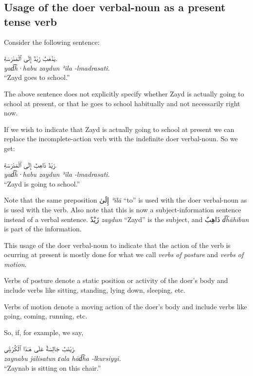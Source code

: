 \documentclass[
  10pt,
]{book}
\begin{document}
\subsection{Usage of the doer verbal-noun as a present tense verb}\label{usage-of-the-doer-verbal-noun-as-a-present-tense-verb}

Consider the following sentence:

\foreignlanguage{arabic}{يَذْهَبُ زَيْدٌ إِلَى ٱلْمَدْرَسَةِ.}\\
\emph{yad͡h·habu zaydun ʾila -lmadrasati.}\\
\enquote{Zayd goes to school.}

The above sentence does not explicitly specify whether Zayd is actually going to school at present, or that he goes to school habitually and not necessarily right now.

If we wish to indicate that Zayd is actually going to school at present we can replace the incomplete-action verb with the indefinite doer verbal-noun. So we get:

\foreignlanguage{arabic}{زَيْدٌ ذَاهِبٌ إِلَى ٱلْمَدْرَسَةِ.}\\
\emph{yad͡h·habu zaydun ʾila -lmadrasati.}\\
\enquote{Zayd is going to school.}

Note that the same preposition \foreignlanguage{arabic}{إِلَىٰ} \emph{ʾilā} \enquote{to} is used with the doer verbal-noun as is used with the verb.
Also note that this is now a subject-information sentence instead of a verbal sentence. \foreignlanguage{arabic}{زَيْدٌ} \emph{zaydun} \enquote{Zayd} is the subject, and \foreignlanguage{arabic}{ذَاهِبٌ} \emph{d͡hāhibun} is part of the information.

This usage of the doer verbal-noun to indicate that the action of the verb is ocurring at present is mostly done for what we call \emph{verbs of posture} and \emph{verbs of motion}.

Verbs of posture denote a static position or activity of the doer's body and include verbs like sitting, standing, lying down, sleeping, etc.

Verbs of motion denote a moving action of the doer's body and include verbs like
going, coming, running, etc.

So, if, for example, we say,

\foreignlanguage{arabic}{زَيْنَبُ جَالِسَةٌ عَلَى هَـٰذَا ٱلْکُرْسِيِّ.}\\
\emph{zaynabu jālisatun ɛala hād͡ha -lkursiyyi.}\\
\enquote{Zaynab is sitting on this chair.}
\end{document}
